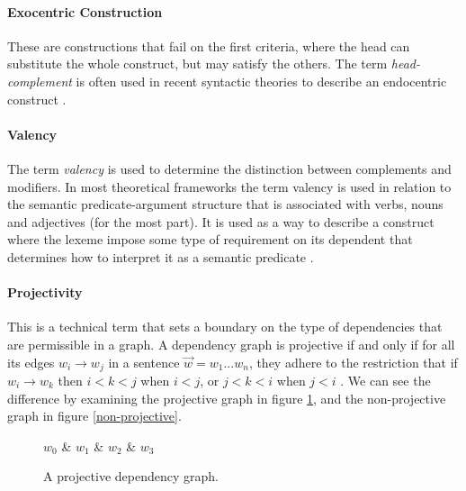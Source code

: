 \paragraph{Exocentric Construction} These are constructions that fail on the first criteria, where the head can substitute the whole construct, but may satisfy the others. The term \textit{head-complement} is often used in recent syntactic theories to describe an endocentric construct \cite{Niv:05}.

\paragraph{Valency} The term \textit{valency} is used to determine the distinction between complements and modifiers. In most theoretical frameworks the term valency is used in relation to the semantic predicate-argument structure that is associated with verbs, nouns and adjectives (for the most part). It is used as a way to describe a construct where the lexeme impose some type of requirement on its dependent that determines how to interpret it as a semantic predicate \cite{Niv:05}.

\paragraph{Projectivity} This is a technical term that sets a boundary on the type of dependencies that are permissible in a graph. A dependency graph is projective if and only if for all its edges $w_i \rightarrow w_j$ in a sentence $\vec{w} = w_1 ... w_n$, they adhere to the restriction that if $w_i \rightarrow w_k$ then $i < k < j$ when $i < j$, or $j < k < i$ when $j < i$ \cite{KublerEtAl:09}. We can see the difference by examining the projective graph in figure \ref{projective}, and the non-projective graph in figure \ref{non-projective}.

\begin{figure}
    \centering
    \begin{dependency}
        \begin{deptext}[column sep=1em, row sep=.1ex]
        $w_0$ \& $w_1$ \& $w_2$ \& $w_3$ \\
        \end{deptext}
    \end{dependency}
    \caption{A projective dependency graph.}
    \label{projective}
\end{figure}

